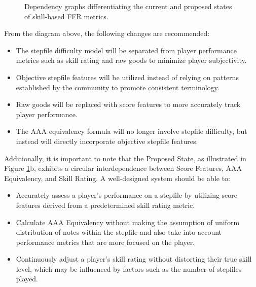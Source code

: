 \begin{center}
\begin{figure}[H]
\begin{subfloat}
{
			}       
		\end{subfloat}
		\caption{Dependency graphs differentiating the current and proposed states of skill-based FFR metrics.}
		\label{fig1}
		
	\end{figure}  
\end{center}

From the diagram above, the following changes are recommended:

\begin{itemize}
	\item The stepfile difficulty model will be separated from player performance metrics such as skill rating and raw goods to minimize player subjectivity.
	\item Objective stepfile features will be utilized instead of relying on patterns established by the community to promote consistent terminology.
	\item Raw goods will be replaced with score features to more accurately track player performance.
	\item The AAA equivalency formula will no longer involve stepfile difficulty, but instead will directly incorporate objective stepfile features.
\end{itemize}

Additionally, it is important to note that the Proposed State, as illustrated in Figure \ref{fig1}b, exhibits a circular interdependence between Score Features, AAA Equivalency, and Skill Rating. A well-designed system should be able to:

\begin{itemize}
	\item Accurately assess a player's performance on a stepfile by utilizing score features derived from a predetermined skill rating metric.
	\item Calculate AAA Equivalency without making the assumption of uniform distribution of notes within the stepfile and also take into account performance metrics that are more focused on the player.
	\item Continuously adjust a player's skill rating without distorting their true skill level, which may be influenced by factors such as the number of stepfiles played.
\end{itemize}

